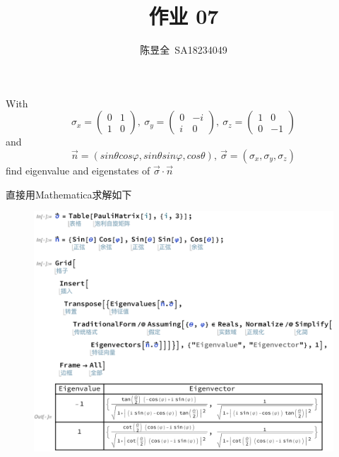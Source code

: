 \documentclass[UTF8,12pt]{article} %
\makeatletter
\newenvironment{proof}[1][\protect\proofname]{\par
\normalfont\topsep6\p@\@plus6\p@\relax
\trivlist
\itemindent\parindent
\item[\hskip\labelsep
\scshape
#1]\ignorespaces
}{%
\endtrivlist\@endpefalse
}
\renewcommand{\proofname}{\it{Solution}}
\makeatother
\begin{document}
\title{作业 07}
\author{陈昱全~SA18234049}
\date{} %
\maketitle

\begin{exercise}{}{}
With $$\sigma_x = \begin{pmatrix}0&1\\1&0\end{pmatrix},~ \sigma_y = \begin{pmatrix}0&-i\\i&0\end{pmatrix},~ \sigma_z = \begin{pmatrix}1&0\\0&-1\end{pmatrix}$$ and $$\vec{n} = (sin\theta cos\varphi, sin\theta sin\varphi, cos\theta),~ \vec{\sigma} = (\sigma_x, \sigma_y, \sigma_z)$$ find eigenvalue and eigenstates of $\vec{\sigma}\cdot\vec{n}$
\end{exercise}

\begin{proof}[解]
直接用Mathematica求解如下
\begin{figure}[H]
\begin{center}
\includegraphics[width=15cm]{prob1}
\end{center}
\end{figure}
\end{proof}
\end{document}
